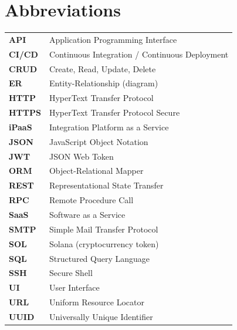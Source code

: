 \documentclass[12pt, a4paper, oneside]{report}
\begin{document}
\clearpage

\renewcommand{\cftchapfont}{\bfseries}
\renewcommand{\cftchappagefont}{\bfseries}
\tableofcontents
\clearpage

\listoffigures
{}
\clearpage

\listoftables
{}
\clearpage

\chapter*{Abbreviations}
\thispagestyle{plain}

\renewcommand{\arraystretch}{1.4}
\begin{tabular}{p{3.5cm} p{10cm}}
\textbf{API}   & Application Programming Interface \\
\textbf{CI/CD} & Continuous Integration / Continuous Deployment \\
\textbf{CRUD}  & Create, Read, Update, Delete \\
\textbf{ER}    & Entity-Relationship (diagram) \\
\textbf{HTTP}  & HyperText Transfer Protocol \\
\textbf{HTTPS} & HyperText Transfer Protocol Secure \\
\textbf{iPaaS} & Integration Platform as a Service \\
\textbf{JSON}  & JavaScript Object Notation \\
\textbf{JWT}   & JSON Web Token \\
\textbf{ORM}   & Object-Relational Mapper \\
\textbf{REST}  & Representational State Transfer \\
\textbf{RPC}   & Remote Procedure Call \\
\textbf{SaaS}  & Software as a Service \\
\textbf{SMTP}  & Simple Mail Transfer Protocol \\
\textbf{SOL}   & Solana (cryptocurrency token) \\
\textbf{SQL}   & Structured Query Language \\
\textbf{SSH}   & Secure Shell \\
\textbf{UI}    & User Interface \\
\textbf{URL}   & Uniform Resource Locator \\
\textbf{UUID}  & Universally Unique Identifier \\
\end{tabular}
\renewcommand{\arraystretch}{1.0}
\end{document}
